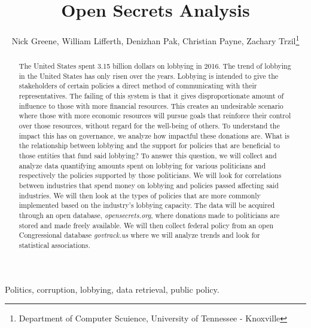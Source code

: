 \documentclass[journal]{IEEEtran}
\begin{document}
\title{Open Secrets Analysis}

\author{Nick Greene, William Lifferth, Denizhan Pak, Christian Payne, Zachary Trzil\thanks{Department of Computer Scuience, University of Tennessee - Knoxville}} \maketitle


\begin{abstract}
  The United States spent 3.15 billion dollars on lobbying in 2016. The trend of lobbying in the United States 
  has only risen over the years. Lobbying is intended to give the stakeholders of certain policies a direct method 
  of communicating with their representatives. The failing of this system is that it gives disproportionate amount 
  of influence to those with more financial resources. This creates an undesirable scenario where those with more 
  economic resources will pursue goals that reinforce their control over those resources, without regard for the 
  well-being of others. To understand the impact this has on governance, we analyze how impactful these donations 
  are. What is the relationship between lobbying and the support for policies that are beneficial to those entities 
  that fund said lobbying? To answer this question, we will collect and analyze data quantifying amounts spent on 
  lobbying for various politicians and respectively the policies supported by those politicians. We will look for 
  correlations between industries that spend money on lobbying and policies passed affecting said industries. We 
  will then look at the types of policies that are more commonly implemented based on the industry's lobbying 
  capacity. The data will be acquired through an open database, \textit{opensecrets.org}, where donations made to 
  politicians are stored and made freely available. We will then collect federal policy from an open Congressional 
  database \textit{govtrack.us} where we will analyze trends and look for statistical associations.
\end{abstract}

\begin{IEEEkeywords}
Politics, corruption, lobbying, data retrieval, public policy.
\end{IEEEkeywords}
\end{document}
